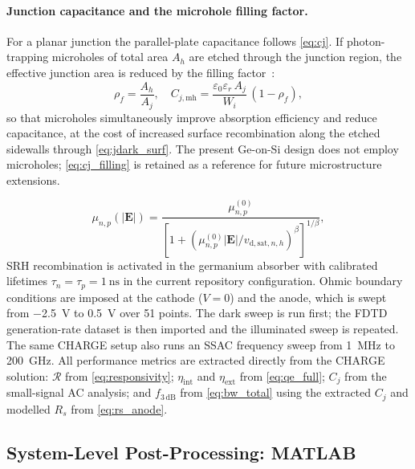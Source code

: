 \paragraph{Junction capacitance and the microhole filling factor.}
For a planar junction the parallel-plate capacitance follows \cref{eq:cj}.
If photon-trapping microholes of total area $A_h$ are etched through the
junction region, the effective junction area is reduced by the filling
factor~\cite{Hamadou2023}:
\begin{equation}
    \rho_f = \frac{A_h}{A_j},
    \quad
    C_{j,\mathrm{mh}}
    = \frac{\varepsilon_0\varepsilon_r\,A_j}{W_i}\,(1-\rho_f),
    \label{eq:cj_filling}
\end{equation}
so that microholes simultaneously improve absorption efficiency and reduce
capacitance, at the cost of increased surface recombination along the
etched sidewalls through \cref{eq:jdark_surf}. The present Ge-on-Si design
does not employ microholes; \cref{eq:cj_filling} is retained as a reference
for future microstructure extensions.

\begin{equation}
    \mu_{n,p}(|\mathbf{E}|) = \frac{\mu_{n,p}^{(0)}}
    {\left[1 + \left(\mu_{n,p}^{(0)}|\mathbf{E}|/v_{\mathrm{d,sat},{n,h}}\right)^{\beta}\right]^{1/\beta}},
    \label{eq:mobility_sat}
\end{equation}
SRH recombination is activated in the germanium absorber with calibrated
lifetimes $\tau_n=\tau_p=\SI{1}{\nano\second}$ in the current repository
configuration. Ohmic boundary conditions are imposed at the cathode
($V=0$) and the anode, which is swept from \SI{-2.5}{\volt} to
\SI{0.5}{\volt} over 51 points. The dark sweep is run first; the FDTD
generation-rate dataset is then imported and the illuminated sweep is repeated.
The same CHARGE setup also runs an SSAC frequency sweep from \SI{1}{\mega\hertz}
to \SI{200}{\giga\hertz}. All performance metrics are
extracted directly from the CHARGE solution: $\mathcal{R}$ from
\cref{eq:responsivity}; $\eta_{\mathrm{int}}$ and $\eta_{\mathrm{ext}}$ from
\cref{eq:qe_full}; $C_j$ from the small-signal AC analysis; and
$f_{3\,\mathrm{dB}}$ from \cref{eq:bw_total} using the extracted $C_j$ and
modelled $R_s$ from \cref{eq:rs_anode}.

\subsection[System-Level Post-Processing: MATLAB]{System-Level Post-Processing: MATLAB}
\label{subsec:pd_matlab}


